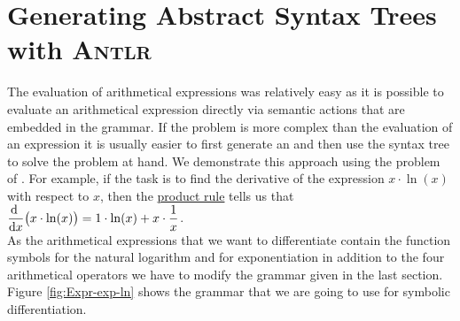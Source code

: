 \section{Generating Abstract Syntax Trees with \textsc{Antlr}}
The evaluation of arithmetical expressions was relatively easy as it is possible to evaluate an arithmetical expression
directly via semantic actions that are embedded in the grammar.  If the problem is more complex than the
evaluation of an expression it is usually easier to first generate an  and then use
the syntax tree to solve the problem at hand.  We demonstrate this approach using the problem of 
.  
For example, if the task is to find the derivative of the expression $x \cdot \ln(x)$
with respect to $x$, then the \href{https://en.wikipedia.org/wiki/Product_rule}{product rule} 
tells us that 
\\[0.2cm]
\hspace*{1.3cm}
$\displaystyle \frac{\mathrm{d} \;}{\mathrm{d} x} \bigl(x \cdot \ln(x)\bigr) = 1 \cdot \ln(x) + x \cdot \frac{1}{x}$.
\\[0.2cm]
As the arithmetical expressions that we want to differentiate contain the function symbols for the natural
logarithm and for exponentiation in addition to the four arithmetical operators we have to modify the grammar
given in the last section.
Figure \ref{fig:Expr-exp-ln} shows the grammar that we are going to use for symbolic differentiation.



